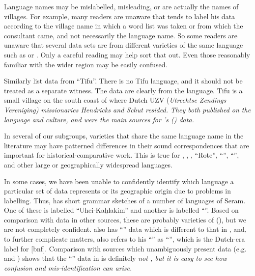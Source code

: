 Language names may be mislabelled,
misleading, or are actually the names of villages.
For example, many readers are unaware that \citet{Collins1983}
tends to label his data according to the village name in which
a word list was taken or from which the consultant came,
and not necessarily the language name.
So some readers are unaware that several data sets are from different
varieties of the same language such as  or .
Only a careful reading may help sort that out.
Even those reasonably familiar with the wider region may be easily confused.

Similarly \citet{BlustTrussel2020} list data from “Tifu”.
There is no Tifu language,
and it should not be treated as a separate witness.
The data are clearly from the  language.
Tifu is a small village on the south coast of  where Dutch
UZV (\it{Utrechtse Zendings Vereniging}) missionaries Hendricks and Schut resided.
They both published on the  language
and culture, and were the main sources for
\citeauthor{Stresemann1927}'s (\citeyear{Stresemann1927})  data.

In several of our subgroups,
varieties that share the same language name in the literature
may have patterned differences in their sound correspondences
that are important for historical-comparative work.
This is true for ,
, , “Rote”, “”,
“”, and other large or geographically widespread languages.

In some cases, we have been unable to confidently identify which
language a particular set of data represents or its geographic
origin due to problems in labelling.
Thus, \citet{Tauern1931} has short grammar sketches of a number
of languages of Seram.
One of these is labelled “Uhei-Kaẖlakim”
and another is labelled “”.
Based on comparison with data in other sources,
these are probably varieties of  (),
but we are not completely confident.
\citet{Stresemann1927} also has “” data which is different
to that in \citet{Tauern1931},
and, to further complicate matters,
\citet{Tauern1931} also refers to his “” as “”,
which is the Dutch-era label for  [bnf].
Comparison with sources which unambiguously present  data
(e.g. \citealp{LeCocqdArmandville1901} and
\citealp{Collins1986})
shows that the “” data in \citet{Tauern1931}
is definitely \it{not} ,
but it is easy to see how confusion
and mis-identification can arise.

